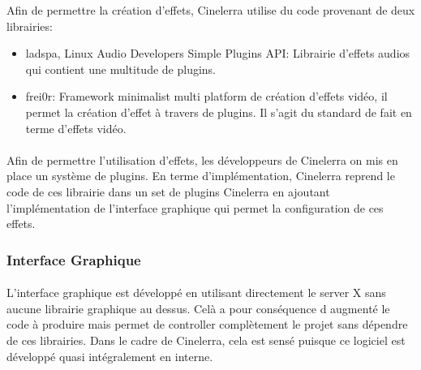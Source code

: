 Afin de permettre la création d'effets, Cinelerra utilise du  code
provenant de deux librairies:

\begin{itemize}

  \item {ladspa, Linux Audio Developers Simple Plugins API: Librairie
  d'effets audios qui
    contient une multitude de plugins.}

  \item {frei0r: Framework minimalist multi platform de création
  d'effets vidéo,
    il permet la création d'effet à travers de plugins. Il s'agit du
    standard de fait en terme d'effets vidéo.}

\end{itemize}

\paragraph{}

Afin de permettre l'utilisation d'effets, les développeurs de Cinelerra
on mis en place un système de plugins. En terme d'implémentation,
Cinelerra reprend le code de ces librairie dans un set de plugins
Cinelerra en ajoutant l'implémentation de l'interface graphique qui
permet la configuration de ces effets.

\subsubsection{Interface Graphique}

\paragraph{}

L'interface graphique est développé en utilisant directement le server
X sans aucune librairie graphique au dessus. Celà a pour conséquence
d augmenté le code à produire mais permet de controller complètement
le projet sans dépendre de ces librairies.  Dans le cadre de Cinelerra,
cela est sensé puisque ce logiciel est développé quasi intégralement
en interne.

